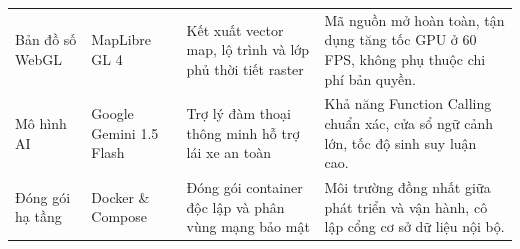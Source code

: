 \begin{table}[H]
\begin{tabularx}{\textwidth}{>{\raggedright\arraybackslash}p{2.6cm} >{\raggedright\arraybackslash}p{2.2cm} >{\raggedright\arraybackslash}p{4.2cm} >{\raggedright\arraybackslash}X}
Bản đồ số WebGL & MapLibre GL 4 & Kết xuất vector map, lộ trình và lớp phủ thời tiết raster & Mã nguồn mở hoàn toàn, tận dụng tăng tốc GPU ở 60 FPS, không phụ thuộc chi phí bản quyền. \\
Mô hình AI & Google Gemini 1.5 Flash & Trợ lý đàm thoại thông minh hỗ trợ lái xe an toàn & Khả năng Function Calling chuẩn xác, cửa sổ ngữ cảnh lớn, tốc độ sinh suy luận cao. \\
Đóng gói hạ tầng & Docker \& Compose & Đóng gói container độc lập và phân vùng mạng bảo mật & Môi trường đồng nhất giữa phát triển và vận hành, cô lập cổng cơ sở dữ liệu nội bộ. \\
\bottomrule
\end{tabularx}
\end{table}
